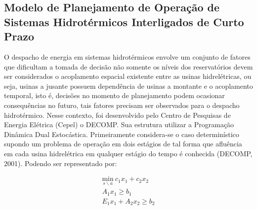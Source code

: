 \documentclass[12pt,fleqn]{article}
\begin{document}
\subsection{Modelo de Planejamento de Opera\c c\~ao de Sistemas Hidrot\'ermicos Interligados de Curto Prazo}
O despacho de energia em sistemas hidrot\'ermicos envolve um conjunto de fatores que dificultam a tomada de decis\~ao
n\~ao somente os n\'iveis dos reservat\'orios devem ser considerados o acoplamento espacial existente entre as usinas
hidrel\'etricas, ou seja, usinas a jusante possuem depend\^encia de usinas a montante e o acoplamento temporal, isto
\'e,
decis\~oes no momento de planejamento podem ocasionar consequ\^encias no futuro, tais fatores  precisam ser observados para
o despacho hidrot\'ermico.
Nesse contexto, foi desenvolvido pelo Centro de Pesquisas de Energia El\'etrica (Cepel) o DECOMP. Sua estrutura
utilizar a Programa\c c\~ao Din\^amica Dual Estoc\'astica. Primeiramente considera-se o caso determin\'istico supondo um problema de opera\c
c\~ao em dois est\'agios de tal forma que 
aflu\^encia em cada usina hidrel\'etrica em qualquer est\'agio do tempo \'e conhecida (DECOMP, 2001). Podendo ser representado por:

\begin{equation}
  \begin{aligned}
	\underset {s \backslash a} {\text{min}}  \ c_1x_1 + c_2x_2 \\
	A_1 x_1 \geq b_1 \\
	E_1 x_1 + A_2 x_2 \geq b_2
	\label{p1}
  \end{aligned}
\end{equation}
\end{document}
